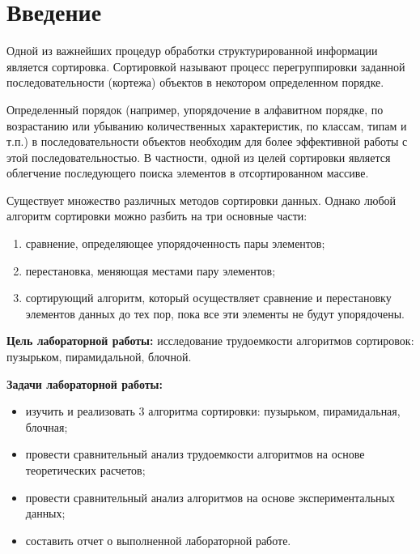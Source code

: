 \newpage
\chapter*{Введение}
Одной из важнейших процедур обработки структурированной информации является сортировка. Сортировкой называют процесс перегруппировки заданной последовательности (кортежа) объектов в некотором определенном порядке. 

Определенный порядок (например, упорядочение в алфавитном порядке, по возрастанию или убыванию количественных характеристик, по классам, типам и т.п.) в последовательности объектов необходим для более эффективной работы с этой последовательностью. В частности, одной из целей сортировки является облегчение последующего поиска элементов в отсортированном массиве. 

Существует множество различных методов сортировки данных. Однако любой алгоритм сортировки можно разбить на три основные части:
\begin{enumerate}
	\item сравнение, определяющее упорядоченность пары элементов;
	\item перестановка, меняющая местами пару элементов;
	\item сортирующий алгоритм, который осуществляет сравнение и перестановку элементов данных до тех пор, пока все эти элементы не будут упорядочены.
\end{enumerate}

\textbf{Цель лабораторной работы:} исследование трудоемкости алгоритмов сортировок: пузырьком, пирамидальной, блочной.

\textbf{Задачи лабораторной работы:}
\begin{itemize}
	\item изучить и реализовать 3 алгоритма сортировки: пузырьком, пирамидальная, блочная;
	\item провести сравнительный анализ трудоемкости алгоритмов на основе теоретических расчетов;
	\newline
	\item провести сравнительный анализ алгоритмов на основе экспериментальных данных;
	\item составить отчет о выполненной лабораторной работе.
\end{itemize}